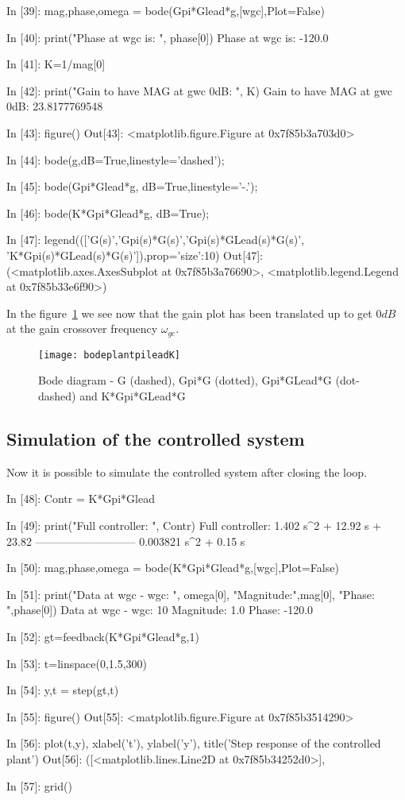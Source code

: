 \begin{code}
In [39]: mag,phase,omega = bode(Gpi*Glead*g,[wgc],Plot=False)

In [40]: print("Phase at wgc is: ", phase[0])
Phase at wgc is:  -120.0

In [41]: K=1/mag[0]

In [42]: print("Gain to have MAG at gwc 0dB: ", K)
Gain to have MAG at gwc 0dB:  23.8177769548

In [43]: figure()
Out[43]: <matplotlib.figure.Figure at 0x7f85b3a703d0>

In [44]: bode(g,dB=True,linestyle='dashed');

In [45]: bode(Gpi*Glead*g, dB=True,linestyle='-.');

In [46]: bode(K*Gpi*Glead*g, dB=True);

In [47]: 
legend((['G(s)','Gpi(s)*G(s)','Gpi(s)*GLead(s)*G(s)',
'K*Gpi(s)*GLead(s)*G(s)']),prop={'size':10})
Out[47]: 
(<matplotlib.axes.AxesSubplot at 0x7f85b3a76690>,
 <matplotlib.legend.Legend at 0x7f85b33e6f90>)
\end{code}

In the figure~\ref{F13} we see now that the gain plot has been translated up to 
get $0dB$ at the gain crossover frequency $\omega_{gc}$.

\begin{figure}[htbp]	%
\centering
\texttt{[image: bodeplantpileadK]}
\caption{Bode diagram - G (dashed), Gpi*G (dotted), Gpi*GLead*G (dot-dashed) 
and K*Gpi*GLead*G}
\label{F13}
\end{figure}

\subsection{Simulation of the controlled system}

Now it is possible to simulate the controlled system after closing the loop.

\begin{code}
In [48]: Contr = K*Gpi*Glead

In [49]: print("Full controller: ", Contr)
Full controller:  
1.402 s^2 + 12.92 s + 23.82
---------------------------
   0.003821 s^2 + 0.15 s

In [50]: mag,phase,omega = bode(K*Gpi*Glead*g,[wgc],Plot=False)

In [51]: print("Data at wgc - wgc: ", omega[0], "Magnitude:",mag[0], "Phase:
",phase[0])
Data at wgc - wgc:  10 Magnitude:  1.0 Phase:  -120.0

In [52]: gt=feedback(K*Gpi*Glead*g,1)

In [53]: t=linspace(0,1.5,300)

In [54]: y,t = step(gt,t)

In [55]: figure()
Out[55]: <matplotlib.figure.Figure at 0x7f85b3514290>

In [56]: plot(t,y), xlabel('t'), ylabel('y'), title('Step response of the 
controlled plant')
Out[56]: 
([<matplotlib.lines.Line2D at 0x7f85b34252d0>],

In [57]: grid()
\end{code}


